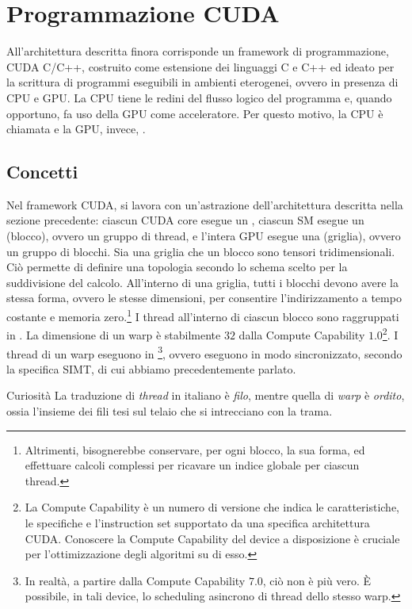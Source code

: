 \chapter{Programmazione CUDA}
All'architettura descritta finora corrisponde un framework di programmazione, CUDA C/C++, costruito come estensione dei linguaggi C e C++ ed ideato per la scrittura di programmi eseguibili in ambienti eterogenei, ovvero in presenza di CPU e GPU.
La CPU tiene le redini del flusso logico del programma e, quando opportuno, fa uso della GPU come acceleratore.
Per questo motivo, la CPU è chiamata  e la GPU, invece, .

\section{Concetti}
Nel framework CUDA, si lavora con un'astrazione dell'architettura descritta nella sezione precedente: ciascun CUDA core esegue un , ciascun SM esegue un  (blocco), ovvero un gruppo di thread, e l'intera GPU esegue una  (griglia), ovvero un gruppo di blocchi.
Sia una griglia che un blocco sono tensori tridimensionali.
Ciò permette di definire una topologia secondo lo schema scelto per la suddivisione del calcolo.
All'interno di una griglia, tutti i blocchi devono avere la stessa forma, ovvero le stesse dimensioni, per consentire l'indirizzamento a tempo costante e memoria zero.\footnote{Altrimenti, bisognerebbe conservare, per ogni blocco, la sua forma, ed effettuare calcoli complessi per ricavare un indice globale per ciascun thread.}
I thread all'interno di ciascun blocco sono raggruppati in .
La dimensione di un warp è stabilmente \(32\) dalla Compute Capability \(1.0\)\footnote{La Compute Capability è un numero di versione che indica le caratteristiche, le specifiche e l'instruction set supportato da una specifica architettura CUDA. Conoscere la Compute Capability del device a disposizione è cruciale per l'ottimizzazione degli algoritmi su di esso.}.
I thread di un warp eseguono in \footnote{In realtà, a partire dalla Compute Capability \(7.0\), ciò non è più vero. È possibile, in tali device, lo scheduling asincrono di thread dello stesso warp.}, ovvero eseguono in modo sincronizzato, secondo la specifica SIMT, di cui abbiamo precedentemente parlato.

\begin{observation}{Curiosità}
    La traduzione di \textit{thread} in italiano è \textit{filo}, mentre quella di \textit{warp} è \textit{ordito}, ossia l'insieme dei fili tesi sul telaio che si intrecciano con la trama.
\end{observation}

